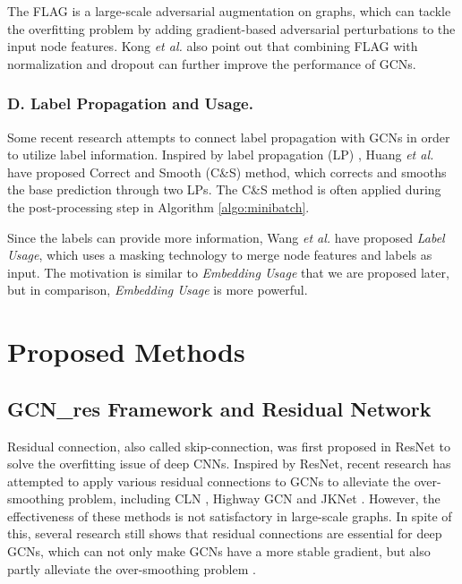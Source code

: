\documentclass[runningheads]{llncs}
\begin{document}
The FLAG \cite{kong2020flag} is a large-scale adversarial augmentation on graphs, which can tackle the overfitting problem by  adding gradient-based adversarial
perturbations to the input node features. Kong \textsl{et al.} \cite{kong2020flag} also point out that combining FLAG with normalization and
dropout can further improve the
performance of GCNs. 

\subsubsection{D. Label Propagation and
Usage.}
Some recent research attempts to connect label propagation with GCNs in order to utilize label information. Inspired by label propagation (LP) \cite{zhu2005semi}, 
Huang \textsl{et al.} \cite{huang2020combining} have proposed Correct and Smooth (C\&S) method, which corrects and smooths the base prediction through two
LPs. The C\&S method is often applied during the post-processing step in Algorithm \ref{algo:minibatch}.

Since the labels can
provide more information, Wang \textsl{et al.} \cite{wang2021bag} have proposed \textsl{Label Usage}, which uses a masking
technology to merge node features and labels as input. The motivation is similar to \textsl{Embedding Usage} that we are proposed
later, but in comparison, \textsl{Embedding Usage} is more
powerful.





\section{Proposed Methods}\label{methods}


\subsection{GCN\_res Framework and Residual
Network}



Residual connection, also called skip-connection, was first
proposed in ResNet \cite{he2016deep} to solve the overfitting
issue of deep CNNs. Inspired by ResNet, recent
research has attempted to apply various residual connections to GCNs
to alleviate the over-smoothing problem, including CLN \cite{pham2017column} , Highway GCN \cite{rahimi2018semi} and JKNet \cite{xu2018representation} . However, the effectiveness of these methods is 
not satisfactory in large-scale graphs. In spite of this, several research still shows that residual connections are essential for deep GCNs, which can not only make GCNs have a more stable gradient, but also
partly alleviate the over-smoothing problem \cite{li2020deepergcn,chen2020simple}.
\end{document}

